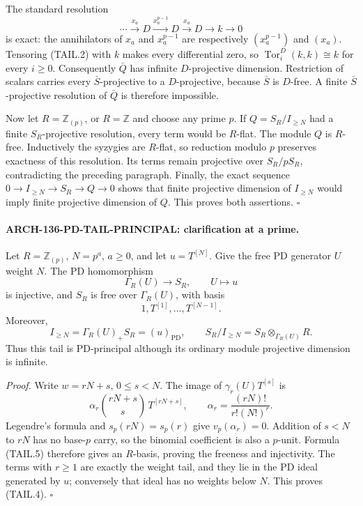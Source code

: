 The standard resolution
\[
 \cdots\xrightarrow{x_a}D\xrightarrow{x_a^{p-1}}D
 \xrightarrow{x_a}D\longrightarrow k\longrightarrow0
 \tag{TAIL.2}
\]
is exact: the annihilators of \(x_a\) and \(x_a^{p-1}\) are respectively
\((x_a^{p-1})\) and \((x_a)\). Tensoring (TAIL.2) with \(k\) makes every
differential zero, so
\(\operatorname{Tor}^D_i(k,k)\cong k\) for every \(i\ge0\).
Consequently \(\bar Q\) has infinite \(D\)-projective dimension.
Restriction of scalars carries every \(\bar S\)-projective to a
\(D\)-projective, because \(\bar S\) is \(D\)-free. A finite
\(\bar S\)-projective resolution of \(\bar Q\) is therefore impossible.

Now let \(R=\mathbb Z_{(p)}\), or \(R=\mathbb Z\) and choose any prime
\(p\). If \(Q=S_R/I_{\ge N}\) had a finite \(S_R\)-projective resolution,
every term would be \(R\)-flat. The module \(Q\) is \(R\)-free.
Inductively the syzygies are \(R\)-flat, so reduction modulo \(p\)
preserves exactness of this resolution. Its terms remain projective
over \(S_R/pS_R\), contradicting the preceding paragraph.
Finally, the exact sequence
\(0\to I_{\ge N}\to S_R\to Q\to0\) shows that finite projective
dimension of \(I_{\ge N}\) would imply finite projective dimension of
\(Q\). This proves both assertions. \(\square\)

\paragraph{ARCH-136-PD-TAIL-PRINCIPAL: clarification at a prime.}
Let \(R=\mathbb Z_{(p)}\), \(N=p^a\), \(a\ge0\), and let \(u=T^{[N]}\).
Give the free PD generator \(U\) weight \(N\).
The PD homomorphism
\[
 \Gamma_R(U)\longrightarrow S_R,\qquad U\longmapsto u
 \tag{TAIL.3}
\]
is injective, and \(S_R\) is free over \(\Gamma_R(U)\), with basis
\[
 1,T^{[1]},\ldots,T^{[N-1]}.
\]
Moreover,
\[
 I_{\ge N}=\Gamma_R(U)_+S_R=(u)_{\mathrm{PD}},\qquad
 S_R/I_{\ge N}=S_R\otimes_{\Gamma_R(U)}R.
 \tag{TAIL.4}
\]
Thus this tail is PD-principal although its ordinary module projective
dimension is infinite.

\emph{Proof.}
Write \(w=rN+s\), \(0\le s<N\). The image of
\(\gamma_r(U)T^{[s]}\) is
\[
 \alpha_r\binom{rN+s}{s}\,T^{[rN+s]},\qquad
 \alpha_r=\frac{(rN)!}{r!(N!)^r}.
 \tag{TAIL.5}
\]
Legendre's formula and \(s_p(rN)=s_p(r)\) give
\(v_p(\alpha_r)=0\). Addition of \(s<N\) to \(rN\) has no base-\(p\)
carry, so the binomial coefficient is also a \(p\)-unit.
Formula (TAIL.5) therefore gives an \(R\)-basis, proving the freeness
and injectivity. The terms with \(r\ge1\) are exactly the weight tail,
and they lie in the PD ideal generated by \(u\); conversely that ideal
has no weights below \(N\). This proves (TAIL.4). \(\square\)

